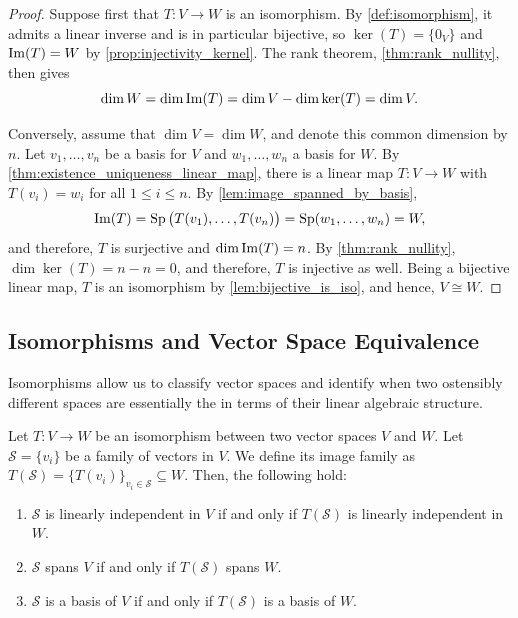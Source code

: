 \begin{proof}
Suppose first that $T: V \to W$ is an isomorphism. By \cref{def:isomorphism}, it admits a linear inverse and is in particular bijective, so $\ker(T) = \{0_V\}$ and $\operatorname{Im}(T) = W$ by \cref{prop:injectivity_kernel}. The rank theorem, \cref{thm:rank_nullity}, then gives
\[
\dim W = \dim \operatorname{Im}(T) = \dim V - \dim \ker(T) = \dim V.
\]

Conversely, assume that $\dim V = \dim W$, and denote this common dimension by $n$. Let $v_1, \dots, v_n$ be a basis for $V$ and $w_1, \dots, w_n$ a basis for $W$. By \cref{thm:existence_uniqueness_linear_map}, there is a linear map $T: V \to W$ with $T(v_i) = w_i$ for all $1 \le i \le n$. By \cref{lem:image_spanned_by_basis},
\[
\operatorname{Im}(T) = \operatorname{Sp}\big(T(v_1), \dots, T(v_n)\big) = \operatorname{Sp}(w_1, \dots, w_n) = W,
\]
and therefore, $T$ is surjective and $\dim \operatorname{Im}(T) = n$. By \cref{thm:rank_nullity}, $\dim \ker(T) = n - n = 0$, and therefore, $T$ is injective as well. Being a bijective linear map, $T$ is an isomorphism by \cref{lem:bijective_is_iso}, and hence, $V \cong W$.
\end{proof}

\subsection{Isomorphisms and Vector Space Equivalence}

Isomorphisms allow us to classify vector spaces and identify when two ostensibly different spaces are essentially the  in terms of their linear algebraic structure.

\begin{theorem}
\label{thm:iso_preserves_bases}
Let $T: V \to W$ be an isomorphism between two vector spaces $V$ and $W$. Let $\mathcal{S} = \{v_i\}$ be a family of vectors in $V$. We define its image family as $T(\mathcal{S}) = \{T(v_i)\}_{v_i \in \mathcal{S}} \subseteq W$. Then, the following hold:
\begin{enumerate}
    \item $\mathcal{S}$ is linearly independent in $V$ if and only if $T(\mathcal{S})$ is linearly independent in $W$.
    \item $\mathcal{S}$ spans $V$ if and only if $T(\mathcal{S})$ spans $W$.
    \item $\mathcal{S}$ is a basis of $V$ if and only if $T(\mathcal{S})$ is a basis of $W$.
\end{enumerate}
\end{theorem}

